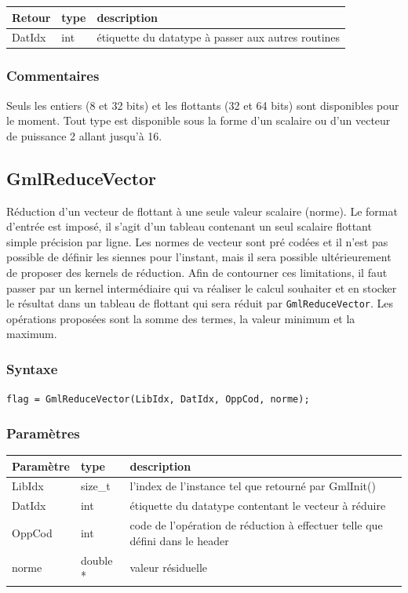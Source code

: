 \documentclass[a4paper,12pt]{article}
\begin{document}
\begin{tabular}{|m{2cm}|m{1.5cm}|m{10.5cm}|}
\hline
Retour     & type   & description \\
\hline
DatIdx     & int    & étiquette du datatype à passer aux autres routines \\
\hline
\end{tabular}

\subsubsection*{Commentaires}
Seuls les entiers (8 et 32 bits) et les flottants (32 et 64 bits) sont disponibles pour le moment.
Tout type est disponible sous la forme d'un scalaire ou d'un vecteur de puissance 2 allant jusqu'à 16.


\subsection{GmlReduceVector}

Réduction d'un vecteur de flottant à une seule valeur scalaire (norme).
Le format d'entrée est imposé, il s'agit d'un tableau contenant un seul scalaire flottant simple précision par ligne.
Les normes de vecteur sont pré codées et il n'est pas possible de définir les siennes pour l'instant, mais il sera possible ultérieurement de proposer des kernels de réduction.
Afin de contourner ces limitations, il faut passer par un kernel intermédiaire qui va réaliser le calcul souhaiter et en stocker le résultat dans un tableau de flottant qui sera réduit par {\tt GmlReduceVector}.
Les opérations proposées sont la somme des termes, la valeur minimum et la maximum.

\subsubsection*{Syntaxe}

{\tt flag = GmlReduceVector(LibIdx, DatIdx, OppCod, norme);}

\subsubsection*{Paramètres}

\begin{tabular}{|m{2cm}|m{1.5cm}|m{10.5cm}|}
\hline
Paramètre  & type     & description \\
\hline
LibIdx     & size\_t  & l'index de l'instance tel que retourné par GmlInit() \\
\hline
DatIdx     & int      & étiquette du datatype contentant le vecteur à réduire  \\
\hline
OppCod     & int      & code de l'opération de réduction à effectuer telle que défini dans le header \\
\hline
norme      & double * & valeur résiduelle \\
\hline
\end{tabular}
\end{document}
